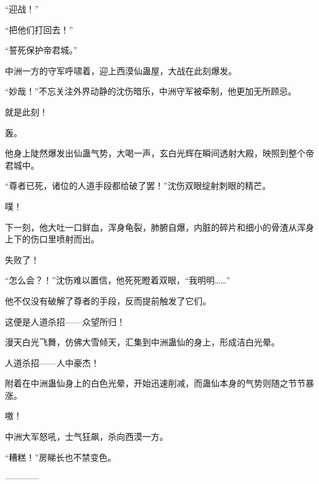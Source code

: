 \begin{this_body}
“迎战！”

“把他们打回去！”

“誓死保护帝君城。”

中洲一方的守军呼啸着，迎上西漠仙蛊屋，大战在此刻爆发。

“妙哉！”不忘关注外界动静的沈伤暗乐，中洲守军被牵制，他更加无所顾忌。

就是此刻！

轰。

他身上陡然爆发出仙蛊气势，大喝一声，玄白光辉在瞬间透射大殿，映照到整个帝君城中。

“尊者已死，诸位的人道手段都给破了罢！”沈伤双眼绽射刺眼的精芒。

噗！

下一刻，他大吐一口鲜血，浑身龟裂，肺腑自爆，内脏的碎片和细小的骨渣从浑身上下的伤口里喷射而出。

失败了！

“怎么会？！”沈伤难以置信，他死死瞪着双眼，“我明明……”

他不仅没有破解了尊者的手段，反而提前触发了它们。

这便是人道杀招——众望所归！

漫天白光飞舞，仿佛大雪倾天，汇集到中洲蛊仙的身上，形成洁白光晕。

人道杀招——人中豪杰！

附着在中洲蛊仙身上的白色光晕，开始迅速削减，而蛊仙本身的气势则随之节节暴涨。

嗷！

中洲大军怒吼，士气狂飙，杀向西漠一方。

“糟糕！”房睇长也不禁变色。

------------

\end{this_body}

